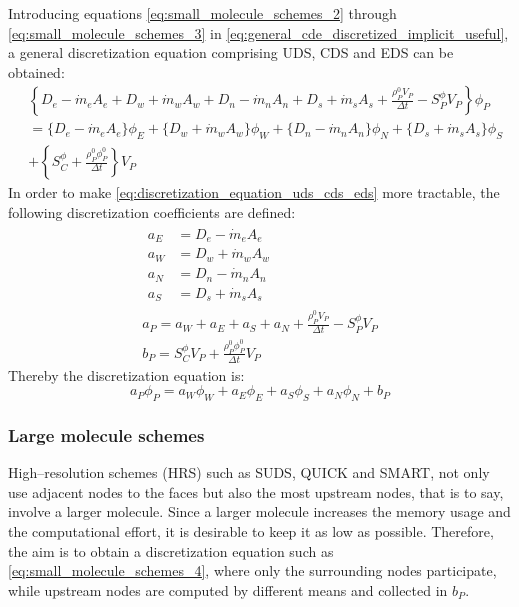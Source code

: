 \noindent
Introducing equations \eqref{eq:small_molecule_schemes_2} through \eqref{eq:small_molecule_schemes_3} in \eqref{eq:general_cde_discretized_implicit_useful}, a general discretization equation comprising UDS, CDS and EDS can be obtained:
\begin{align} 
	&\left\{
	D_e - \dot{m}_e A_e +
	D_w + \dot{m}_w A_w +
	D_n - \dot{m}_n A_n +
	D_s + \dot{m}_s A_s + 
	\frac{\rho_P^0 V_P}{\Delta t} - S_P^\phi V_P
	\right\} \phi_P \nonumber \\
	&= 
	\Big\{ D_e - \dot{m}_e A_e \Big\} \phi_E + 
	\Big\{ D_w + \dot{m}_w A_w \Big\} \phi_W + 
	\Big\{ D_n - \dot{m}_n A_n \Big\} \phi_N + 
	\Big\{ D_s + \dot{m}_s A_s \Big\} \phi_S \nonumber \\
	&+ \left\{ S_C^\phi + \frac{\rho_P^0 \phi_P^0}{\Delta t} \right\} V_P \label{eq:discretization_equation_uds_cds_eds}
\end{align}
In order to make \eqref{eq:discretization_equation_uds_cds_eds} more tractable, the following discretization coefficients are defined:
\begin{gather}
	\begin{align}
		a_E &= D_e - \dot{m}_e A_e \\
		a_W &= D_w + \dot{m}_w A_w \\
		a_N &= D_n - \dot{m}_n A_n \\
		a_S &= D_s + \dot{m}_s A_s
	\end{align} \\
	a_P = a_W + a_E + a_S + a_N + \frac{\rho_P^0 V_P}{\Delta t} - S_P^\phi V_P \\
	b_P = S_C^\phi V_P + \frac{\rho_P^0 \phi_P^0}{\Delta t} V_P
\end{gather}
Thereby the discretization equation is:
\begin{equation} \label{eq:small_molecule_schemes_4}
	a_P \phi_P = a_W \phi_W + a_E \phi_E + a_S \phi_S + a_N \phi_N + b_P
\end{equation}

\subsubsection{Large molecule schemes}

High--resolution schemes (HRS) such as SUDS, QUICK and SMART, not only use adjacent nodes to the faces but also the most upstream nodes, that is to say, involve a larger molecule. Since a larger molecule increases the memory usage and the computational effort, it is desirable to keep it as low as possible. Therefore, the aim is to obtain a discretization equation such as \eqref{eq:small_molecule_schemes_4}, where only the surrounding nodes participate, while upstream nodes are computed by different means and collected in $b_P$. 

